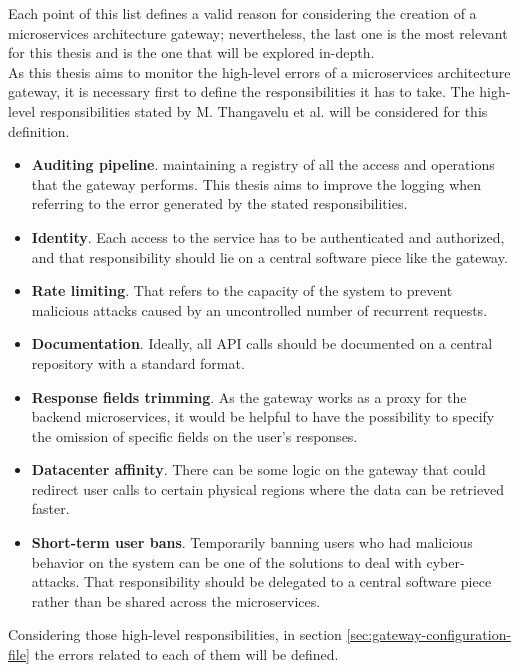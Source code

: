 \documentclass[english, 12pt, a4paper, sci, utf8, a-1b, online]{aaltothesis}
\begin{document}
Each point of this list defines a valid reason for considering the creation of a microservices architecture gateway; nevertheless, the last one is the most relevant for this thesis and is the one that will be explored in-depth.\\

As this thesis aims to monitor the high-level errors of a microservices architecture gateway, it is necessary first to define the responsibilities it has to take. The high-level responsibilities stated by M. Thangavelu et al. \cite{UberGateway} will be considered for this definition.

\begin{itemize}
    \item \textbf{Auditing pipeline}. maintaining a registry of all the access and operations that the gateway performs. This thesis aims to improve the logging when referring to the error generated by the stated responsibilities.
    \item \textbf{Identity}. Each access to the service has to be authenticated and authorized, and that responsibility should lie on a central software piece like the gateway.
    \item \textbf{Rate limiting}. That refers to the capacity of the system to prevent malicious attacks caused by an uncontrolled number of recurrent requests.
    \item \textbf{Documentation}. Ideally, all API calls should be documented on a central repository with a standard format.
    \item \textbf{Response fields trimming}. As the gateway works as a proxy for the backend microservices, it would be helpful to have the possibility to specify the omission of specific fields on the user's responses.
    \item \textbf{Datacenter affinity}. There can be some logic on the gateway that could redirect user calls to certain physical regions where the data can be retrieved faster.
    \item \textbf{Short-term user bans}. Temporarily banning users who had malicious behavior on the system can be one of the solutions to deal with cyber-attacks. That responsibility should be delegated to a central software piece rather than be shared across the microservices.
\end{itemize}

Considering those high-level responsibilities, in section \ref{sec:gateway-configuration-file} the errors related to each of them will be defined.
\end{document}
